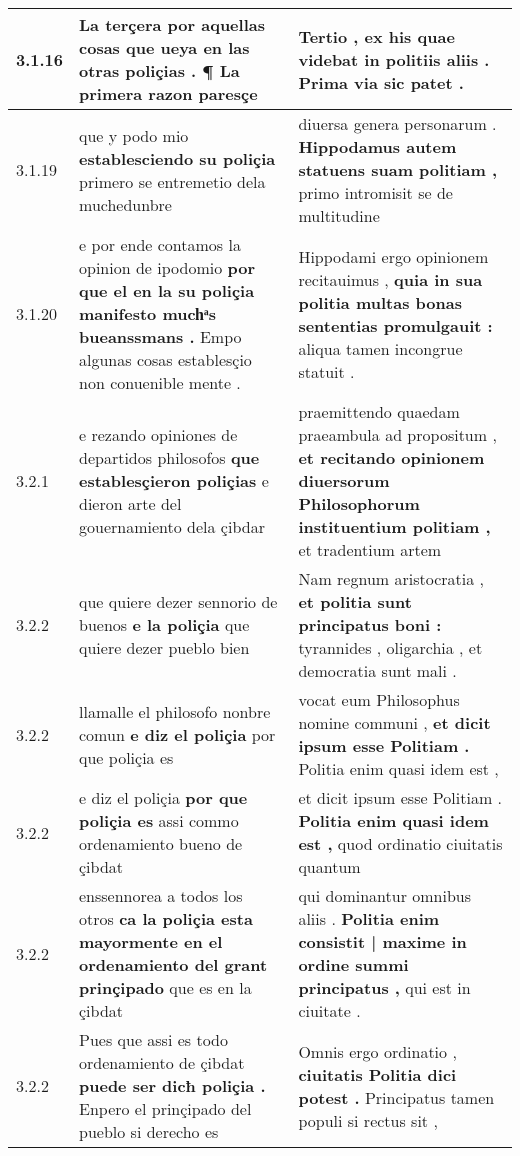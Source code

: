 \begin{tabular}{|p{1cm}|p{6.5cm}|p{6.5cm}|}
3.1.16 & La terçera por aquellas cosas \textbf{ que ueya en las otras poliçias . } ¶ La primera razon paresçe & Tertio , ex his quae videbat \textbf{ in politiis aliis . } Prima via sic patet . \\\hline
3.1.19 & que y podo mio \textbf{ establesciendo su poliçia } primero se entremetio dela muchedunbre & diuersa genera personarum . \textbf{ Hippodamus autem statuens suam politiam , } primo intromisit se de multitudine \\\hline
3.1.20 & e por ende contamos la opinion de ipodomio \textbf{ por que el en la su poliçia manifesto muchͣs bueanssmans . } Empo algunas cosas establesçio non conuenible mente . & Hippodami ergo opinionem recitauimus , \textbf{ quia in sua politia multas bonas sententias promulgauit : } aliqua tamen incongrue statuit . \\\hline
3.2.1 & e rezando opiniones de departidos philosofos \textbf{ que establesçieron poliçias } e dieron arte del gouernamiento dela çibdar & praemittendo quaedam praeambula ad propositum , \textbf{ et recitando opinionem diuersorum Philosophorum instituentium politiam , } et tradentium artem \\\hline
3.2.2 & que quiere dezer sennorio de buenos \textbf{ e la poliçia } que quiere dezer pueblo bien & Nam regnum aristocratia , \textbf{ et politia sunt principatus boni : } tyrannides , oligarchia , et democratia sunt mali . \\\hline
3.2.2 & llamalle el philosofo nonbre comun \textbf{ e diz el poliçia } por que poliçia es & vocat eum Philosophus nomine communi , \textbf{ et dicit ipsum esse Politiam . } Politia enim quasi idem est , \\\hline
3.2.2 & e diz el poliçia \textbf{ por que poliçia es } assi commo ordenamiento bueno de çibdat & et dicit ipsum esse Politiam . \textbf{ Politia enim quasi idem est , } quod ordinatio ciuitatis quantum \\\hline
3.2.2 & enssennorea a todos los otros \textbf{ ca la poliçia esta mayormente en el ordenamiento del grant prinçipado } que es en la çibdat & qui dominantur omnibus aliis . \textbf{ Politia enim consistit | maxime in ordine summi principatus , } qui est in ciuitate . \\\hline
3.2.2 & Pues que assi es todo ordenamiento de çibdat \textbf{ puede ser dicħ poliçia . } Enpero el prinçipado del pueblo si derecho es & Omnis ergo ordinatio , \textbf{ ciuitatis Politia dici potest . } Principatus tamen populi si rectus sit , \\\hline

\end{tabular}
